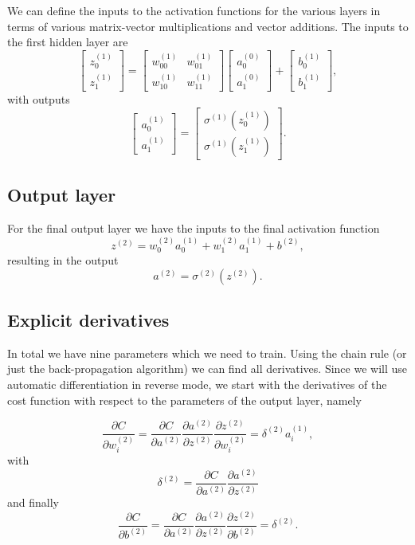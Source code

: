\documentclass[%
oneside,                 %
final,                   %
10pt]{article}
\begin{document}
We can define the inputs to the activation functions for the various layers in terms of various matrix-vector multiplications and vector additions.
The inputs to the first hidden layer are
\[
\begin{bmatrix}z_0^{(1)} \\ z_1^{(1)} \end{bmatrix}=\begin{bmatrix}w_{00}^{(1)} & w_{01}^{(1)}\\ w_{10}^{(1)} &w_{11}^{(1)} \end{bmatrix}\begin{bmatrix}a_0^{(0)} \\ a_1^{(0)} \end{bmatrix}+\begin{bmatrix}b_0^{(1)} \\ b_1^{(1)} \end{bmatrix},
\]
with outputs
\[
\begin{bmatrix}a_0^{(1)} \\ a_1^{(1)} \end{bmatrix}=\begin{bmatrix}\sigma^{(1)}(z_0^{(1)}) \\ \sigma^{(1)}(z_1^{(1)}) \end{bmatrix}.
\]

\subsection{Output layer}

For the final output layer we have the inputs to the final activation function 
\[
z^{(2)} = w_{0}^{(2)}a_0^{(1)} +w_{1}^{(2)}a_1^{(1)}+b^{(2)},
\]
resulting in the  output
\[
a^{(2)}=\sigma^{(2)}(z^{(2)}).
\]

\subsection{Explicit derivatives}

In total we have nine parameters which we need to train.  Using the
chain rule (or just the back-propagation algorithm) we can find all
derivatives. Since we will use automatic differentiation in reverse
mode, we start with the derivatives of the cost function with respect
to the parameters of the output layer, namely

\[
\frac{\partial C}{\partial w_{i}^{(2)}}=\frac{\partial C}{\partial a^{(2)}}\frac{\partial a^{(2)}}{\partial z^{(2)}}\frac{\partial z^{(2)}}{\partial w_{i}^{(2)}}=\delta^{(2)}a_i^{(1)},
\]
with
\[
\delta^{(2)}=\frac{\partial C}{\partial a^{(2)}}\frac{\partial a^{(2)}}{\partial z^{(2)}}
\]
and finally
\[
\frac{\partial C}{\partial b^{(2)}}=\frac{\partial C}{\partial a^{(2)}}\frac{\partial a^{(2)}}{\partial z^{(2)}}\frac{\partial z^{(2)}}{\partial b^{(2)}}=\delta^{(2)}.
\]
\end{document}
